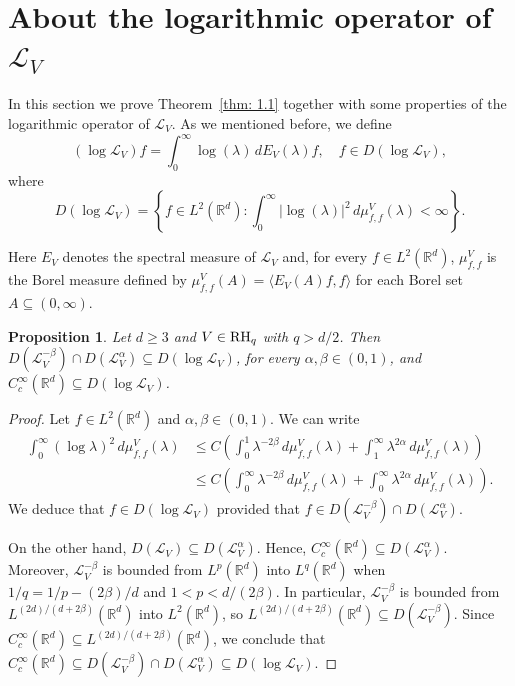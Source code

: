 \documentclass[10pt, a4paper, reqno]{amsart}
\newtheorem{prop}[thm]{Proposition}
\theoremstyle{definition}
\theoremstyle{remark}
\newcommand{\RH}{\textup{RH}}
\numberwithin{equation}{section}
\begin{document}
\section{About the logarithmic operator of \texorpdfstring{$\mathcal{L}_V$}{LV}}\label{sec: 2}


In this section we prove Theorem~\ref{thm: 1.1} together with some properties of the logarithmic operator of $\mathcal{L}_V$. As we mentioned before, we define 
\[
(\log \mathcal{L}_V) f = \int_0^\infty \log(\lambda) \, dE_V(\lambda) f, \quad f \in D(\log \mathcal{L}_V),
\]
where
\begin{equation*}
    D(\log \mathcal{L}_V) = \left\{ 
    f \in L^2(\mathbb{R}^d) : \int_{0}^\infty |\log(\lambda)|^2 \, d\mu_{f,f}^V(\lambda) < \infty \right\}.
\end{equation*}

Here $E_V$ denotes the spectral measure of $\mathcal{L}_V$ and, for every $f \in L^2(\mathbb{R}^d)$, $\mu_{f,f}^V$ is the Borel measure defined by $\mu_{f,f}^V(A) = \langle E_V(A) f, f \rangle$ for each Borel set $A \subseteq (0,\infty)$.

\begin{prop}\label{prop: 2.1}
    Let $d \geq 3$ and $V \in \RH_q$ with $q > d/2$. Then $D(\mathcal{L}_V^{-\beta}) \cap D(\mathcal{L}_V^{\alpha}) \subseteq D(\log \mathcal{L}_V)$, for every $\alpha, \beta \in (0,1)$, and $C_c^\infty (\mathbb{R}^d) \subseteq D(\log \mathcal{L}_V)$.
\end{prop}
\begin{proof}
    Let $f \in L^2(\mathbb{R}^d)$ and $\alpha, \beta \in (0,1)$. We can write
    \begin{equation*}
        \begin{split}
            \int_0^\infty (\log \lambda)^2 \, d\mu_{f,f}^V(\lambda) & \leq C 
            \left( \int_0^1 \lambda^{-2\beta} \, d\mu_{f,f}^V(\lambda) + \int_1^\infty \lambda^{2\alpha} \, d\mu_{f,f}^V(\lambda)\right) \\
            & \leq C 
            \left( \int_0^\infty \lambda^{-2\beta} \, d\mu_{f,f}^V(\lambda) + \int_0^\infty \lambda^{2\alpha} \, d\mu_{f,f}^V(\lambda)\right).
        \end{split}
    \end{equation*}
    We deduce that $f \in D(\log \mathcal{L}_V)$ provided that $f \in D(\mathcal{L}_V^{-\beta}) \cap D(\mathcal{L}_V^{\alpha})$.

    On the other hand, $D(\mathcal{L}_V) \subseteq D(\mathcal{L}_V^\alpha)$. Hence, $C_c^\infty(\mathbb{R}^d) \subseteq D(\mathcal{L}_V^\alpha)$. Moreover, $\mathcal{L}_V^{-\beta}$ is bounded from $L^p(\mathbb{R}^d)$ into $L^q(\mathbb{R}^d)$ when $1/q = 1/p - (2\beta)/d$ and $1 < p < d/(2\beta)$. In particular, $\mathcal{L}_V^{-\beta}$ is bounded from $L^{(2d)/(d+2\beta)}(\mathbb{R}^d)$ into $L^2(\mathbb{R}^d)$, so $L^{(2d)/(d+2\beta)}(\mathbb{R}^d) \subseteq D(\mathcal{L}_V^{-\beta})$. Since $C_c^\infty(\mathbb{R}^d) \subseteq L^{(2d)/(d+2\beta)}(\mathbb{R}^d)$, we conclude that $C_c^\infty(\mathbb{R}^d) \subseteq D(\mathcal{L}_V^{-\beta}) \cap D(\mathcal{L}_V^\alpha) \subseteq D(\log \mathcal{L}_V)$.
\end{proof}
\end{document}
